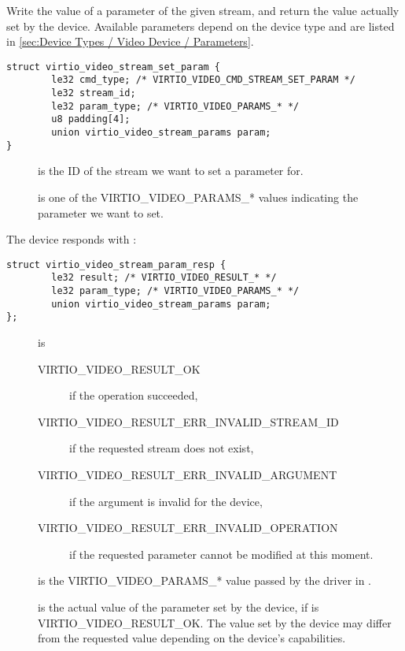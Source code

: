 Write the value of a parameter of the given stream, and return the value
actually set by the device. Available parameters depend on the device
type and are listed in
\ref{sec:Device Types / Video Device / Parameters}.

\begin{lstlisting}
struct virtio_video_stream_set_param {
        le32 cmd_type; /* VIRTIO_VIDEO_CMD_STREAM_SET_PARAM */
        le32 stream_id;
        le32 param_type; /* VIRTIO_VIDEO_PARAMS_* */
        u8 padding[4];
        union virtio_video_stream_params param;
}
\end{lstlisting}

\begin{description}
\item[]
is the ID of the stream we want to set a parameter for.
\item[]
is one of the VIRTIO_VIDEO_PARAMS_* values indicating the parameter
we want to set.
\end{description}

The device responds with :

\begin{lstlisting}
struct virtio_video_stream_param_resp {
        le32 result; /* VIRTIO_VIDEO_RESULT_* */
        le32 param_type; /* VIRTIO_VIDEO_PARAMS_* */
        union virtio_video_stream_params param;
};
\end{lstlisting}

\begin{description}
\item[]
is

\begin{description}
\item[VIRTIO_VIDEO_RESULT_OK]
if the operation succeeded,
\item[VIRTIO_VIDEO_RESULT_ERR_INVALID_STREAM_ID]
if the requested stream does not exist,
\item[VIRTIO_VIDEO_RESULT_ERR_INVALID_ARGUMENT]
if the  argument is invalid for the device,
\item[VIRTIO_VIDEO_RESULT_ERR_INVALID_OPERATION]
if the requested parameter cannot be modified at this moment.
\end{description}
\item[]
is the VIRTIO_VIDEO_PARAMS_* value passed by the driver in
.
\item[]
is the actual value of the parameter set by the device, if
 is VIRTIO_VIDEO_RESULT_OK. The value set by the device
may differ from the requested value depending on the device's
capabilities.
\end{description}

